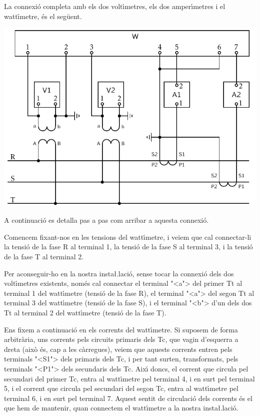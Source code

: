 \begin{exemple}
    La connexi\'{o} completa amb els dos volt\'{\i}metres, els dos amper\'{\i}metres i el watt\'{\i}metre, \'{e}s el seg\"{u}ent.

    \begin{center}
        \includegraphics{Imatges/Cap-TrafosMesProt-Instal-Watt.pdf}
    \end{center}

    A continuaci\'{o} es detalla pas a pas com arribar a aquesta connexi\'{o}.

    Comencem fixant-nos en les tensions del watt\'{\i}metre, i veiem que cal
    connectar-li la tensi\'{o} de la fase R al terminal 1, la tensi\'{o} de la
    fase S al terminal 3, i la tensi\'{o} de la fase T al terminal 2.

    Per aconseguir-ho en la nostra insta{\l.l}aci\'{o}, sense tocar la
    connexi\'{o} dels dos volt\'{\i}metres existents, nom\'{e}s cal connectar
    el terminal {"<}\textsf{a}{">} del primer Tt al terminal 1 del watt\'{\i}metre (tensi\'{o} de
    la fase R), el terminal {"<}\textsf{a}{">} del segon Tt al terminal 3 del watt\'{\i}metre
    (tensi\'{o} de la fase S), i el terminal {"<}\textsf{b}{">} d'un dels dos Tt
    al terminal 2 del watt\'{\i}metre (tensi\'{o} de la fase T).

    Ens fixem a continuaci\'{o} en els corrents del watt\'{\i}metre. Si suposem
    de forma arbitr\`{a}ria, uns corrents pels circuits primaris dels Tc,
    que vagin d'esquerra a dreta (aix\`{o} \'{e}s, cap a les c\`{a}rregues), veiem
    que aquests corrents entren pels terminals {"<}\textsf{S1}{">} dels primaris dels Tc,
    i per tant surten, transformats, pels terminals {"<}\textsf{P1}{">} dels secundaris
    dels Tc. Aix\'{\i} doncs, el corrent que circula pel secundari del primer
    Tc, entra al watt\'{\i}metre pel terminal 4, i en surt pel terminal 5, i
    el corrent que circula pel secundari del segon Tc, entra al
    watt\'{\i}metre pel terminal 6, i en surt pel terminal 7. Aquest sentit
    de circulaci\'{o} dels corrents \'{e}s el que hem de mantenir, quan
    connectem el watt\'{\i}metre a la nostra insta{\l.l}aci\'{o}.


\end{exemple}
